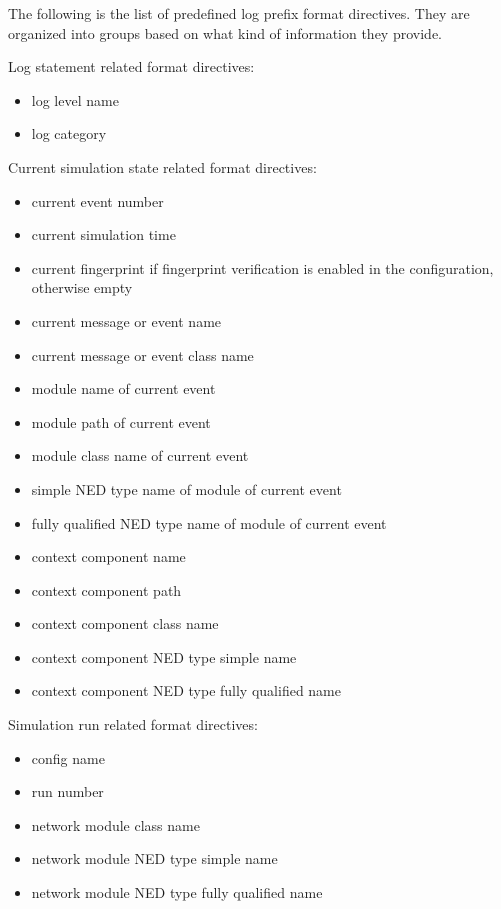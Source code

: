 The following is the list of predefined log prefix format directives. They are
organized into groups based on what kind of information they provide.

Log statement related format directives:
\begin{itemize}
  \item {} log level name
  \item {} log category
\end{itemize}

Current simulation state related format directives:
\begin{itemize}
  \item {} current event number
  \item {} current simulation time
  \item {} current fingerprint if fingerprint verification is enabled in the configuration, otherwise empty
  \item {} current message or event name
  \item {} current message or event class name
  \item {} module name of current event
  \item {} module path of current event
  \item {} module class name of current event
  \item {} simple NED type name of module of current event
  \item {} fully qualified NED type name of module of current event
  \item {} context component name
  \item {} context component path
  \item {} context component class name
  \item {} context component NED type simple name
  \item {} context component NED type fully qualified name
\end{itemize}

Simulation run related format directives:
\begin{itemize}
  \item {} config name
  \item {} run number
  \item {} network module class name
  \item {} network module NED type simple name
  \item {} network module NED type fully qualified name
\end{itemize}

